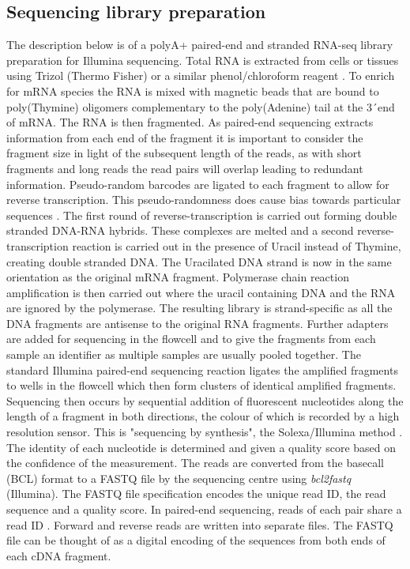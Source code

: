 \subsection{Sequencing library preparation}

The description below is of a polyA+ paired-end and  stranded RNA-seq library preparation for Illumina sequencing.
Total RNA is extracted from cells or tissues using Trizol (Thermo Fisher) or a similar phenol/chloroform reagent \citep{Chomczynski1987}. 
To enrich for mRNA species the RNA is mixed with magnetic beads that are bound to poly(Thymine) oligomers complementary to the poly(Adenine) tail at the 3\'\ end of mRNA. 
The RNA is then fragmented. 
As paired-end sequencing extracts information from each end of the fragment it is important to consider the fragment size in light of the subsequent length of the reads, as with short fragments and long reads the read pairs will overlap leading to redundant information. 
Pseudo-random barcodes are ligated to each fragment to allow for reverse transcription. 
This pseudo-randomness does cause bias towards particular sequences \citep{VanGurp2013}.
The first round of reverse-transcription is carried out forming double stranded DNA-RNA hybrids. 
These complexes are melted and a second reverse-transcription reaction is carried out in the presence of Uracil instead of Thymine, creating double stranded DNA. The Uracilated DNA strand is now in the same orientation as the original mRNA fragment. 
Polymerase chain reaction amplification is then carried out where the uracil containing DNA and the RNA are ignored by the polymerase. 
The resulting library is strand-specific as all the DNA fragments are antisense to the original RNA fragments. Further adapters are added for sequencing in the flowcell and to give the fragments from each sample an identifier as multiple samples are usually pooled together. 
The standard Illumina paired-end sequencing reaction ligates the amplified fragments to wells in the flowcell which then form clusters of identical amplified fragments. 
Sequencing then occurs by sequential addition of fluorescent nucleotides along the length of a fragment in both directions, the  colour of which is recorded by a high resolution sensor. 
This is "sequencing by synthesis", the Solexa/Illumina method \citep{Bentley2008}.
The identity of each nucleotide is determined and given a quality score based on the confidence of the measurement. 
The reads are converted from the basecall (BCL) format to a FASTQ file by the sequencing centre using \textit{bcl2fastq} (Illumina).
The FASTQ file specification \citep{Cock2009} encodes the unique read ID, the read sequence and a quality score. In paired-end sequencing, reads of each pair share a read ID . 
Forward and reverse reads are written into separate files.  
The FASTQ file can be thought of as a digital encoding of the sequences from both ends of each cDNA fragment.

